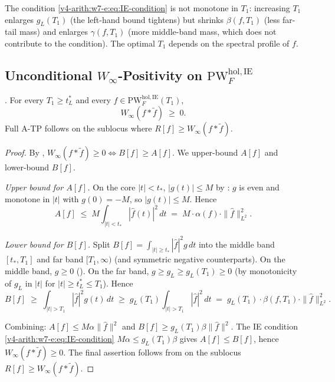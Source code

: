 \begin{remark}[monotonicity in \(T_{1}\)]
\label{v4-arith:w7-e:rem:monotonicity-T1}
The condition \eqref{v4-arith:w7-e:eq:IE-condition} is not monotone
in \(T_{1}\): increasing \(T_{1}\) enlarges \(g_{L}(T_{1})\) (the left-hand bound
tightens) but shrinks \(\beta(f,T_{1})\) (less far-tail
mass) and enlarges \(\gamma(f,T_{1})\) (more middle-band mass, which
does not contribute to the condition). The optimal \(T_{1}\) depends
on the spectral profile of \(f\).
\end{remark}

\subsection{Unconditional \(W_{\infty}\)-Positivity on \(\mathrm{PW}^{\mathrm{hol},\mathrm{IE}}_{F}\)}
\label{v4-arith:w7-e:IE-closure}

\begin{theorem}
\label{v4-arith:w7-e:thm:IE-ATP}
\ClaimStatusProvedHere. For every \(T_{1}\geq t_{L}^{\ast}\) and every
\(f\in\mathrm{PW}^{\mathrm{hol},\mathrm{IE}}_{F}(T_{1})\),
\begin{equation}
\label{v4-arith:w7-e:eq:IE-closure}
W_{\infty}(f*\widetilde{f})\;\geq\;0.
\end{equation}
Full A-TP follows on the sublocus where
\(R[f]\geq W_{\infty}(f*\widetilde f)\).
\end{theorem}

\begin{proof}
By ,
\(W_{\infty}(f*\widetilde{f})\geq 0\iff B[f]\geq A[f]\). We upper-bound
\(A[f]\) and lower-bound \(B[f]\).

\emph{Upper bound for \(A[f]\).} On the core \(|t|<t_{\ast}\), \(|g(t)|\leq M\)
by : \(g\) is even and monotone in
\(|t|\) with \(g(0)=-M\), so \(|g(t)|\leq M\). Hence
\[
A[f]\;\leq\;M\int_{|t|<t_{\ast}}|\widehat{f}(t)|^{2}\,dt\;=\;M\cdot\alpha(f)\cdot\|\widehat{f}\|_{L^{2}}^{2}.
\]

\emph{Lower bound for \(B[f]\).} Split
\(B[f]=\int_{|t|\geq t_{\ast}}|\widehat{f}|^{2}g\,dt\) into the middle
band \([t_{\ast},T_{1}]\) and far band \([T_{1},\infty)\) (and symmetric
negative counterparts). On the middle band, \(g\geq 0\)
(). On the far band,
\(g\geq g_{L}\geq g_{L}(T_{1})\geq 0\) (by monotonicity of \(g_{L}\) in
\(|t|\) for \(|t|\geq t_{L}^{\ast}\leq T_{1}\)). Hence
\[
B[f]\;\geq\;\int_{|t|>T_{1}}|\widehat{f}|^{2}g(t)\,dt\;\geq\;g_{L}(T_{1})\int_{|t|>T_{1}}|\widehat{f}|^{2}\,dt\;=\;g_{L}(T_{1})\cdot\beta(f,T_{1})\cdot\|\widehat{f}\|_{L^{2}}^{2}.
\]

Combining: \(A[f]\leq M\alpha\|\widehat{f}\|^{2}\) and
\(B[f]\geq g_{L}(T_{1})\beta\|\widehat{f}\|^{2}\). The IE condition
\eqref{v4-arith:w7-e:eq:IE-condition}
\(M\alpha\leq g_{L}(T_{1})\beta\) gives \(A[f]\leq B[f]\), hence
\(W_{\infty}(f*\widetilde{f})\geq 0\). The final assertion follows
from  on the sublocus
\(R[f]\geq W_{\infty}(f*\widetilde f)\).
\end{proof}


